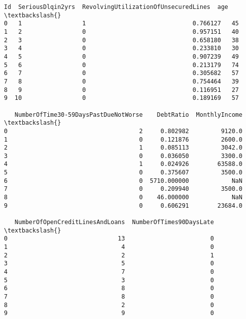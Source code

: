 \documentclass[11pt]{article}
\makeatletter
\newcommand{\boxspacing}{\kern\kvtcb@left@rule\kern\kvtcb@boxsep}
\newcommand{\prompt}[4]{
        {\ttfamily\llap{{\color{#2}[#3]:\hspace{3pt}#4}}\vspace{-\baselineskip}}
    }
\makeatother
\begin{document}
            \begin{tcolorbox}[breakable, size=fbox, boxrule=.5pt, pad at break*=1mm, opacityfill=0]
\prompt{Out}{outcolor}{4}{\boxspacing}
\begin{Verbatim}[commandchars=\\\{\}]
   Id  SeriousDlqin2yrs  RevolvingUtilizationOfUnsecuredLines  age  \textbackslash{}
0   1                 1                              0.766127   45
1   2                 0                              0.957151   40
2   3                 0                              0.658180   38
3   4                 0                              0.233810   30
4   5                 0                              0.907239   49
5   6                 0                              0.213179   74
6   7                 0                              0.305682   57
7   8                 0                              0.754464   39
8   9                 0                              0.116951   27
9  10                 0                              0.189169   57

   NumberOfTime30-59DaysPastDueNotWorse    DebtRatio  MonthlyIncome  \textbackslash{}
0                                     2     0.802982         9120.0
1                                     0     0.121876         2600.0
2                                     1     0.085113         3042.0
3                                     0     0.036050         3300.0
4                                     1     0.024926        63588.0
5                                     0     0.375607         3500.0
6                                     0  5710.000000            NaN
7                                     0     0.209940         3500.0
8                                     0    46.000000            NaN
9                                     0     0.606291        23684.0

   NumberOfOpenCreditLinesAndLoans  NumberOfTimes90DaysLate  \textbackslash{}
0                               13                        0
1                                4                        0
2                                2                        1
3                                5                        0
4                                7                        0
5                                3                        0
6                                8                        0
7                                8                        0
8                                2                        0
9                                9                        0


\end{Verbatim}
\end{tcolorbox}
\end{document}
